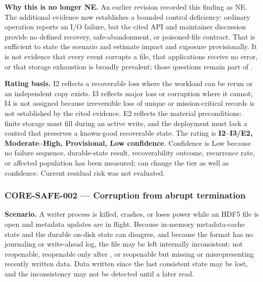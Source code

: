 \documentclass[../main.tex]{subfiles}
\begin{document}
\noindent\textbf{Why this is no longer NE.}
An earlier revision recorded this finding as NE. The additional evidence now
establishes a bounded control deficiency: ordinary operation reports an I/O
failure, but the cited API and maintainer discussion provide no defined
recovery, safe-abandonment, or poisoned-file contract. That is sufficient to
state the scenario and estimate impact and exposure provisionally. It is not evidence
that every  event corrupts a file, that applications receive no
error, or that storage exhaustion is broadly prevalent; those questions remain
part of .

\noindent\textbf{Rating basis.}
I2 reflects a recoverable loss where the workload can be rerun or an
independent copy exists. I3 reflects major loss or corruption where it cannot;
I4 is not assigned because irreversible loss of unique or mission-critical
records is not established by the cited evidence. E2 reflects the material
preconditions: finite storage must fill during an active write, and the
deployment must lack a control that preserves a known-good recoverable state.
The rating is \textbf{I2--I3/E2, Moderate--High, Provisional, Low confidence}.
Confidence is Low because no failure sequence, durable-state result,
recoverability outcome, recurrence rate, or affected population has been
measured;  can change the tier as well as confidence. Current
residual risk was not evaluated.

\subsubsection*{CORE-SAFE-002 --- Corruption from abrupt termination}

\noindent\textbf{Scenario.}
A writer process is killed, crashes, or loses power while an HDF5 file is open
and metadata updates are in flight. Because in-memory metadata-cache state and
the durable on-disk state can disagree, and because the format has no
journaling or write-ahead log, the file may be left internally inconsistent:
not reopenable, reopenable only after , or reopenable but
missing or misrepresenting recently written data. Data written since the last
consistent state may be lost, and the inconsistency may not be detected until a
later read.
\end{document}
